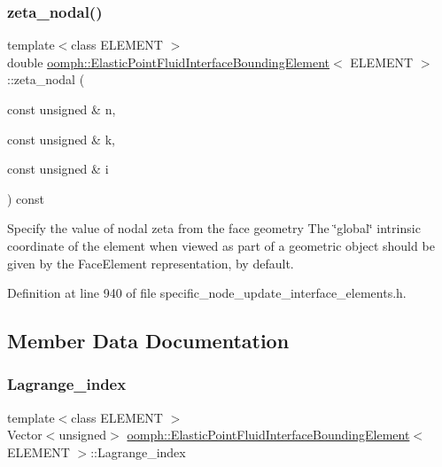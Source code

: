 \subsubsection{\texorpdfstring{zeta\+\_\+nodal()}{zeta\_nodal()}}
{\footnotesize\ttfamily template$<$class E\+L\+E\+M\+E\+NT $>$ \\
double \hyperlink{classoomph_1_1ElasticPointFluidInterfaceBoundingElement}{oomph\+::\+Elastic\+Point\+Fluid\+Interface\+Bounding\+Element}$<$ E\+L\+E\+M\+E\+NT $>$\+::zeta\+\_\+nodal (\begin{DoxyParamCaption}\item[{const unsigned \&}]{n,  }\item[{const unsigned \&}]{k,  }\item[{const unsigned \&}]{i }\end{DoxyParamCaption}) const\hspace{0.3cm}{\ttfamily [inline]}}



Specify the value of nodal zeta from the face geometry The \char`\"{}global\char`\"{} intrinsic coordinate of the element when viewed as part of a geometric object should be given by the Face\+Element representation, by default. 



Definition at line 940 of file specific\+\_\+node\+\_\+update\+\_\+interface\+\_\+elements.\+h.



\subsection{Member Data Documentation}
\mbox{\label{classoomph_1_1ElasticPointFluidInterfaceBoundingElement_a6ba345f9959aa12708c3ef8598327bc2}} 
\subsubsection{\texorpdfstring{Lagrange\+\_\+index}{Lagrange\_index}}
{\footnotesize\ttfamily template$<$class E\+L\+E\+M\+E\+NT $>$ \\
Vector$<$unsigned$>$ \hyperlink{classoomph_1_1ElasticPointFluidInterfaceBoundingElement}{oomph\+::\+Elastic\+Point\+Fluid\+Interface\+Bounding\+Element}$<$ E\+L\+E\+M\+E\+NT $>$\+::Lagrange\+\_\+index\hspace{0.3cm}{\ttfamily [private]}}



